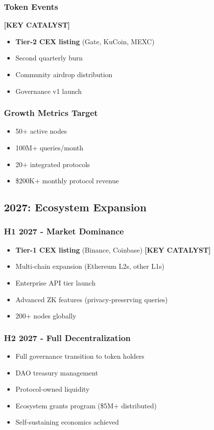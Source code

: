 \documentclass[12pt,a4paper]{article}
\begin{document}
\subsubsection{Token Events} \textbf{[KEY CATALYST]}
\begin{itemize}
    \item \textbf{Tier-2 CEX listing} (Gate, KuCoin, MEXC)
    \item Second quarterly burn
    \item Community airdrop distribution
    \item Governance v1 launch
\end{itemize}

\subsubsection{Growth Metrics Target}
\begin{itemize}
    \item 50+ active nodes
    \item 100M+ queries/month
    \item 20+ integrated protocols
    \item \$200K+ monthly protocol revenue
\end{itemize}

\subsection{2027: Ecosystem Expansion}

\subsubsection{H1 2027 - Market Dominance}
\begin{itemize}
    \item \textbf{Tier-1 CEX listing} (Binance, Coinbase) \textbf{[KEY CATALYST]}
    \item Multi-chain expansion (Ethereum L2s, other L1s)
    \item Enterprise API tier launch
    \item Advanced ZK features (privacy-preserving queries)
    \item 200+ nodes globally
\end{itemize}

\subsubsection{H2 2027 - Full Decentralization}
\begin{itemize}
    \item Full governance transition to token holders
    \item DAO treasury management
    \item Protocol-owned liquidity
    \item Ecosystem grants program (\$5M+ distributed)
    \item Self-sustaining economics achieved
\end{itemize}
\end{document}
